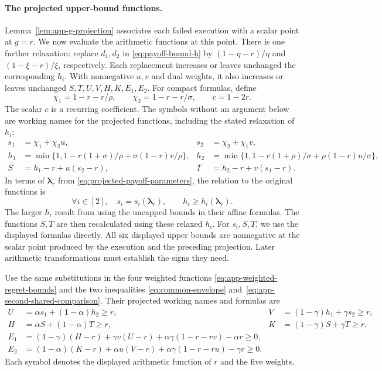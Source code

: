 \documentclass[11pt]{article}
\theoremstyle{remark}
\theoremstyle{plain}
\begin{document}
\paragraph{The projected upper-bound functions.}
Lemma~\ref{lem:app-g-projection} associates each failed execution
with a scalar point at $g=r$. We now evaluate the arithmetic
functions at this point.
There is one further relaxation: replace $d_1,d_2$ in
\eqref{eq:payoff-bound-h} by $(1-\eta-r)/\eta$ and
$(1-\xi-r)/\xi$, respectively. Each replacement increases or leaves
unchanged the corresponding $h_i$. With nonnegative $u,v$ and
dual weights, it also increases or leaves unchanged
$S,T,U,V,H,K,E_1,E_2$.
For compact formulas, define
\begin{equation}
 \chi_1=1-r-r/\rho,\qquad
 \chi_2=1-r-r/\sigma,\qquad c=1-2r.
 \label{eq:app-projected-coefficients}
\end{equation}
The scalar $c$ is a recurring coefficient.
The symbols without an argument below are working names for
the projected functions, including the stated relaxation of $h_i$:
\begin{equation}
 \begin{aligned}
 s_1&=\chi_1+\chi_2u,&
 s_2&=\chi_2+\chi_1v,\\
 h_1&=\min\{1,1-r(1+\sigma)/\rho+\sigma(1-r)v/\rho\},&
 h_2&=\min\{1,1-r(1+\rho)/\sigma+\rho(1-r)u/\sigma\},\\
 S&=h_1-r+u(s_2-r),&
 T&=h_2-r+v(s_1-r).
 \end{aligned}
 \label{eq:scalar-caps}
\end{equation}
In terms of $\boldsymbol\lambda_r$ from
\eqref{eq:projected-payoff-parameters}, the relation to the original
functions is
\[
 \forall i\in[2],\quad s_i=s_i(\boldsymbol\lambda_r),\qquad
 h_i\ge h_i(\boldsymbol\lambda_r).
\]
The larger $h_i$ result from using the uncapped bounds in their
affine formulas. The functions $S,T$ are then recalculated using
these relaxed $h_i$. For $s_i,S,T$, we use the displayed formulas directly.
All six displayed upper bounds are nonnegative at the scalar
point produced by the execution and the preceding projection.
Later arithmetic transformations must establish the signs they need.

Use the same substitutions in the four weighted functions
\eqref{eq:app-weighted-regret-bounds} and the two inequalities
\eqref{eq:common-envelope} and~\eqref{eq:app-second-shared-comparison}.
Their projected working names and formulas are
\begin{equation}
 \begin{aligned}
 U&=\alpha s_1+(1-\alpha)h_2\ge r,&
 V&=(1-\gamma)h_1+\gamma s_2\ge r,\\
 H&=\alpha S+(1-\alpha)T\ge r,&
 K&=(1-\gamma)S+\gamma T\ge r,\\
 E_1&=(1-\gamma)(H-r)+\gamma v(U-r)
                         +\alpha\gamma(1-r-rv)-\alpha r\ge0,\\
 E_2&=(1-\alpha)(K-r)+\alpha u(V-r)
                         +\alpha\gamma(1-r-ru)-\gamma r\ge0.
 \end{aligned}
 \label{eq:scalar-sources}
\end{equation}
Each symbol denotes the displayed arithmetic function of $r$
and the five weights.
\end{document}
